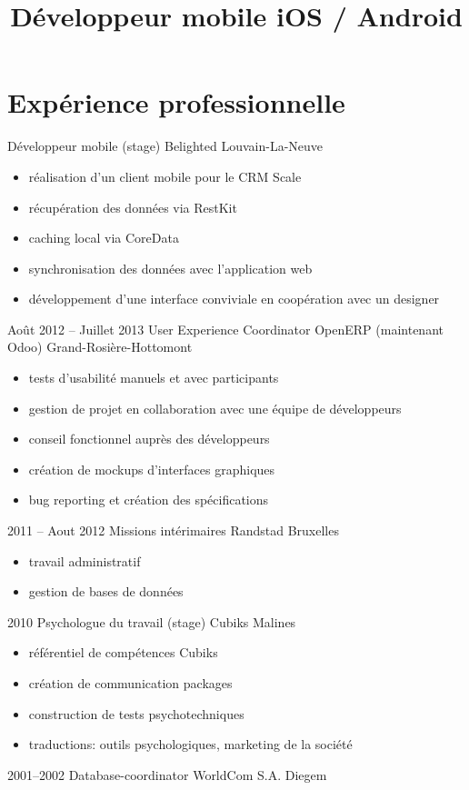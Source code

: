 \documentclass[11pt, a4paper]{moderncv}
\title{Développeur mobile iOS / Android}
\begin{document}
\makecvtitle
\section{Expérience professionnelle}
		{Développeur mobile (stage)}
		{Belighted}
		{Louvain-La-Neuve}
		{}
		{
			\begin{itemize}
				\item réalisation d'un client mobile pour le CRM Scale
				\item récupération des données via RestKit
				\item caching local via CoreData
				\item synchronisation des données avec l’application web
				\item développement d’une interface conviviale en coopération avec un designer
			\end{itemize}
			}
	\cventry
		{Août 2012  -- \linebreak Juillet 2013}
		{User Experience Coordinator}
		{OpenERP (maintenant Odoo)}
		{Grand-Rosière-Hottomont}
		{}
		{
			\begin{itemize}
				\item tests d’usabilité manuels et avec participants
				\item gestion de projet en collaboration avec une équipe de développeurs
				\item conseil fonctionnel  auprès des développeurs
				\item création de mockups d’interfaces graphiques
				\item bug reporting et création des spécifications
			\end{itemize}
			}
	
	\cventry
		{2011 -- \linebreak Aout 2012}
		{Missions intérimaires}
		{Randstad}
		{Bruxelles}
		{}
		{
			\begin{itemize}
				\item travail administratif
				\item gestion de bases de données
			\end{itemize}			
			}
	
	\cventry
		{2010}
		{Psychologue du travail (stage)}
		{Cubiks}
		{Malines}
		{}
		{
			\begin{itemize}
				\item référentiel de compétences Cubiks
				\item création de  communication packages
				\item construction de tests psychotechniques
				\item traductions: outils psychologiques, marketing de la société
			\end{itemize}
			}
	\cventry
		{2001--2002}
		{Database-coordinator}
		{WorldCom S.A.}
		{Diegem}
		{}{}
\end{document}
